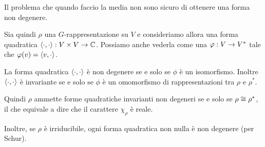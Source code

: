 	Il problema che quando faccio la media non sono sicuro di ottenere una forma non degenere.
	
	Sia quindi $\rho$ una $G$-rappresentazione su $V$ e consideriamo allora una forma quadratica $\langle\cdot , \cdot\rangle: V \times V \rightarrow \mathbb C$.
	Possiamo anche vederla come una $\varphi: V \rightarrow V^*$ tale che $\varphi(v) = \langle v , \cdot\rangle$. 
	
	\begin{myprop}
		La forma quadratica $\langle\cdot , \cdot\rangle$ è non degenere se e solo se $\phi$ è un isomorfismo. Inoltre $\langle\cdot , \cdot\rangle $ è invariante se e solo se $\phi$ è un omomorfismo di rappresentazioni tra $\rho$ e $\rho^*$.
	\end{myprop}
	
	Quindi $\rho$ ammette forme quadratiche invarianti non degeneri se e solo se $\rho \cong \rho^*$, il che equivale a dire che il carattere $\chi_\rho$ è reale.
	
	Inoltre, se $\rho$ è irriducibile, ogni forma quadratica non nulla è non degenere (per Schur).

	
	
	
	